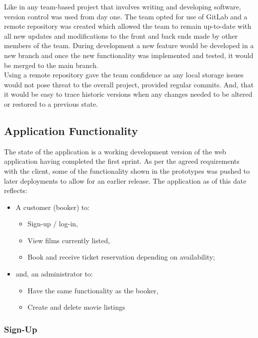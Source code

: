 \documentclass[11pt, english]{article}
\begin{document}
	Like in any team-based project that involves writing and developing software, version control was used from day one. The team opted for use of GitLab and a remote repository was created which allowed the team to remain up-to-date with all new updates and modifications to the front and back ends made by other members of the team. During development a new feature would be developed in a new branch and once the new functionality was implemented and tested, it would be merged to the main branch.\\

	Using a remote repository gave the team confidence as any local storage issues would not pose threat to the overall project, provided regular commits. And, that it would be easy to trace historic versions when any changes needed to be altered or restored to a previous state.

	\subsection{Application Functionality}

	The state of the application is a working development version of the web application having completed the first sprint. As per the agreed requirements with the client, some of the functionality shown in the prototypes was pushed to later deployments to allow for an earlier release. The application as of this date reflects:

	\begin{itemize}
	\setlength\itemsep{0cm}
		\item A customer (booker) to:
		\begin{itemize}
			\item Sign-up / log-in,
			\item View films currently listed,
			\item Book and receive ticket reservation depending on availability;
		\end{itemize}
		\item and, an administrator to:
		\begin{itemize}
			\item Have the same functionality as the booker,
			\item Create and delete movie listings
		\end{itemize}
	\end{itemize}

		\subsubsection{Sign-Up}
\end{document}
